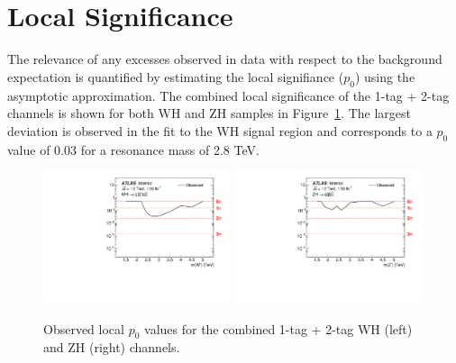 \section{Local Significance}

The relevance of any excesses observed in data with respect to the background expectation is quantified by estimating the local signifiance ($p_0$) using the asymptotic approximation.
The combined local significance of the 1-tag + 2-tag channels is shown for both WH and ZH samples in Figure~\ref{fig:local_p0_combined}.
The largest deviation is observed in the fit to the WH signal region and corresponds to a $p_0$ value of 0.03 for a resonance mass of 2.8 TeV.

\begin{figure}[htbp!]
    \begin{center}
        \includegraphics[width=0.49\textwidth]{VHqqbbLocalP0_WH.pdf}
        \includegraphics[width=0.49\textwidth]{VHqqbbLocalP0_ZH.pdf}
    \end{center}
    \caption{Observed local $p_0$ values for the combined 1-tag + 2-tag WH (left) and ZH (right) channels.}
    \label{fig:local_p0_combined}
\end{figure}

